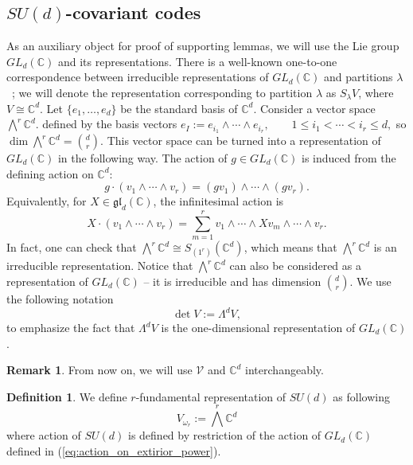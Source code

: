 \documentclass[10pt,twocolumn,superscriptaddress,aps,amsmath,amssymb,citeautoscript,floatfix,prx]{revtex4-2}
\theoremstyle{plain}
\theoremstyle{plain}
\theoremstyle{plain}
\theoremstyle{plain}
\theoremstyle{plain}
\theoremstyle{plain}
\newcommand{\C}{\mathbb{C}}
\theoremstyle{plain}
\theoremstyle{definition}
\newtheorem{smdefinition}[smtheorem]{Definition}
\newtheorem{smremark}[smtheorem]{Remark}
\theoremstyle{plain}
\begin{document}
\begin{appendix}
\section{\texorpdfstring{$SU(d)$}{SU(d)}-covariant codes}\label{sec:supple_sud}

As an auxiliary object for proof of supporting lemmas, we will use the Lie group $GL_d(\mathbb{C})$ and its representations. 
There is a well-known one-to-one correspondence between irreducible representations of $GL_d(\mathbb{C})$ and partitions $\lambda$~\cite{FultonHarris1991}; we will
denote the representation corresponding to partition $\lambda$ as $S_\lambda V$, where $V\cong \mathbb{C}^d$.
Let \(\{e_1,\ldots,e_d\}\) be the standard basis of \(\mathbb C^d\). Consider a vector space
$
    \bigwedge^r \mathbb C^d.
$
defined by the basis vectors
$
    e_I:=e_{i_1}\wedge\cdots\wedge e_{i_r},
    \qquad
    1\le i_1<\cdots<i_r\le d,
$
so $\dim \bigwedge^r \mathbb C^d=\binom dr$. This vector space can be turned into a representation of $GL_d(\mathbb{C})$ in the following way.
The action of \(g\in GL_d(\mathbb{C})\) is induced from the defining action on
\(\mathbb C^d\):
\begin{equation}\label{eq:action_on_extirior_power}
    g\cdot(v_1\wedge\cdots\wedge v_r)
    =
    (gv_1)\wedge\cdots\wedge(gv_r).
\end{equation}
Equivalently, for \(X\in\mathfrak{gl}_d(\mathbb{C})\), the infinitesimal action is
\[
    X\cdot(v_1\wedge\cdots\wedge v_r)
    =
    \sum_{m=1}^r
    v_1\wedge\cdots\wedge Xv_m\wedge\cdots\wedge v_r.
\]
In fact, one can check that $\bigwedge^r \mathbb C^d\cong S_{\left(1^r\right)}\left(\mathbb{C}^d\right)$, 
which means that $\bigwedge^r \mathbb C^d$ is an irreducible representation.
Notice that $\bigwedge^r \mathbb C^d$ can also be considered as a representation of $GL_d(\mathbb{C})$ -- it is irreducible and has dimension $\binom{d}{r}$.
We use the following notation
\[
    \operatorname{det} V:=\Lambda^d V,
\]
to emphasize the fact that $\Lambda^d V$ is the one-dimensional representation of $GL_d(\mathbb{C})$.

\begin{smremark}
    From now on, we will use $\mathcal{V}$ and $\C^d$ interchangeably.
\end{smremark}

\begin{smdefinition}\label{def:rfundSUd}
    We define $r$-fundamental representation of $SU(d)$ as following
    \[
        V_{\omega_r}:=\bigwedge^r \mathbb C^d
    \]
    where action of $SU(d)$ is defined by restriction of the action of $GL_d(\mathbb{C})$ defined in (\ref{eq:action_on_extirior_power}).
\end{smdefinition}


\end{appendix}
\end{document}
